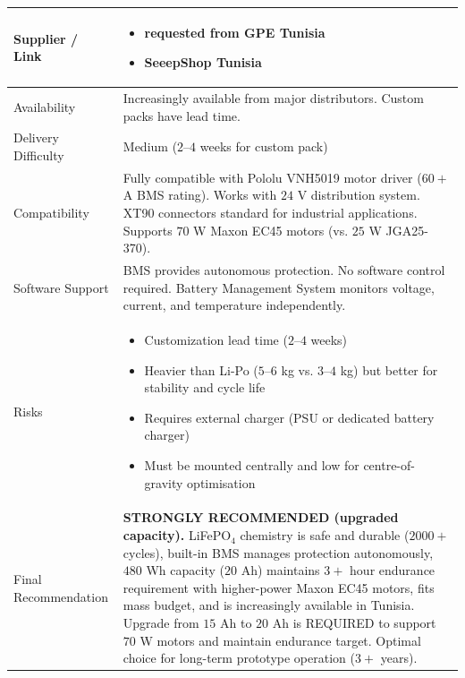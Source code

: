 \documentclass[12pt,a4paper]{article}
\begin{document}
\begin{longtable}{|p{4cm}|p{10cm}|}
Supplier / Link &
\begin{itemize}
\item requested from GPE Tunisia 
\item SeeepShop Tunisia 
\end{itemize}
\\
\hline

Availability &
Increasingly available from major distributors. Custom packs have lead time. \\
\hline

Delivery Difficulty &
Medium ($2$--$4$ weeks for custom pack) \\
\hline

Compatibility &
Fully compatible with Pololu VNH5019 motor driver ($60+$ A BMS rating). Works with $24$ V distribution system. XT90 connectors standard for industrial applications. Supports $70$ W Maxon EC45 motors (vs. $25$ W JGA25-370). \\
\hline

Software Support &
BMS provides autonomous protection. No software control required. Battery Management System monitors voltage, current, and temperature independently. \\
\hline

Risks &
\begin{itemize}
\item Customization lead time ($2$--$4$ weeks)
\item Heavier than Li-Po ($5$--$6$ kg vs. $3$--$4$ kg) but better for stability and cycle life
\item Requires external charger (PSU or dedicated battery charger)
\item Must be mounted centrally and low for centre-of-gravity optimisation
\end{itemize}
\\
\hline

Final Recommendation &
\textbf{STRONGLY RECOMMENDED (upgraded capacity).} LiFePO$_4$ chemistry is safe and durable ($2000+$ cycles), built-in BMS manages protection autonomously, $480$ Wh capacity ($20$ Ah) maintains $3+$ hour endurance requirement with higher-power Maxon EC45 motors, fits mass budget, and is increasingly available in Tunisia. Upgrade from $15$ Ah to $20$ Ah is REQUIRED to support $70$ W motors and maintain endurance target. Optimal choice for long-term prototype operation ($3+$ years). \\
\hline

\end{longtable}
\end{document}
